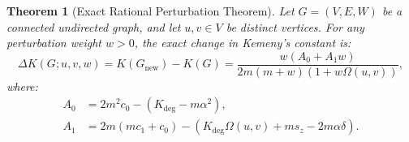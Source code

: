 \documentclass[11pt,a4paper]{article}
\theoremstyle{plain}
\newtheorem{theorem}{Theorem}[section]
\theoremstyle{definition}
\begin{document}
\begin{theorem}[Exact Rational Perturbation Theorem]
\label{thm:rational_perturbation}
Let $G = (V, E, W)$ be a connected undirected graph, and let $u, v \in V$ be distinct vertices. For any perturbation weight $w > 0$, the exact change in Kemeny's constant is:
\begin{equation}
    \Delta K(G; u, v, w) = K(G_{\mathrm{new}}) - K(G) = \frac{w (A_0 + A_1 w)}{2m(m + w)(1 + w \Omega(u, v))},
\end{equation}
where:
\begin{align}
    A_0 &= 2m^2 c_0 - (K_{\mathrm{deg}} - m \alpha^2), \label{eq:A0_def} \\
    A_1 &= 2m(m c_1 + c_0) - (K_{\mathrm{deg}} \Omega(u, v) + m s_z - 2m \alpha \delta). \label{eq:A1_def}
\end{align}
\end{theorem}
\end{document}
